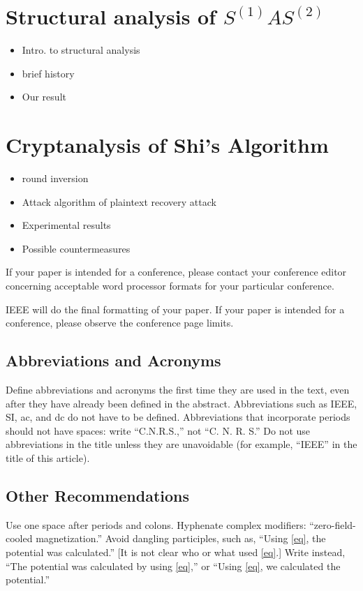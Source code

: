 \documentclass{ieeeaccess}
\begin{document}
\section{Structural analysis of $S^{(1)}AS^{(2)}$}

\begin{itemize}
\item Intro. to structural analysis
\item brief history
\item Our result
\end{itemize}

\section{Cryptanalysis of Shi's Algorithm}

\begin{itemize}
\item round inversion
\item Attack algorithm of plaintext recovery attack
\item Experimental results
\item Possible countermeasures
\end{itemize}




If your paper is intended for a conference, please contact your conference 
editor concerning acceptable word processor formats for your particular 
conference. 

IEEE will do the final formatting of your paper. If your paper is intended 
for a conference, please observe the conference page limits. 

\subsection{Abbreviations and Acronyms}
Define abbreviations and acronyms the first time they are used in the text, 
even after they have already been defined in the abstract. Abbreviations 
such as IEEE, SI, ac, and dc do not have to be defined. Abbreviations that 
incorporate periods should not have spaces: write ``C.N.R.S.,'' not ``C. N. 
R. S.'' Do not use abbreviations in the title unless they are unavoidable 
(for example, ``IEEE'' in the title of this article).

\subsection{Other Recommendations}
Use one space after periods and colons. Hyphenate complex modifiers: 
``zero-field-cooled magnetization.'' Avoid dangling participles, such as, 
``Using \eqref{eq}, the potential was calculated.'' [It is not clear who or what 
used \eqref{eq}.] Write instead, ``The potential was calculated by using \eqref{eq},'' or 
``Using \eqref{eq}, we calculated the potential.''
\end{document}
